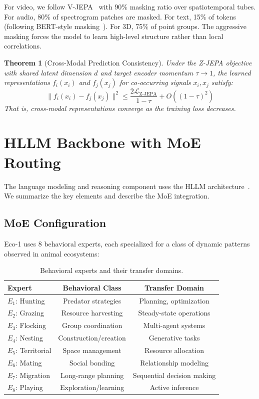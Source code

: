 \documentclass[11pt,letterpaper]{article}
\newtheorem{theorem}{Theorem}[section]
\begin{document}
For video, we follow V-JEPA~\cite{bardes2024vjepa} with 90\% masking ratio over spatiotemporal tubes. For audio, 80\% of spectrogram patches are masked. For text, 15\% of tokens (following BERT-style masking~\cite{devlin2019bert}). For 3D, 75\% of point groups. The aggressive masking forces the model to learn high-level structure rather than local correlations.

\begin{theorem}[Cross-Modal Prediction Consistency]
\label{thm:consistency}
Under the Z-JEPA objective with shared latent dimension $d$ and target encoder momentum $\tau \to 1$, the learned representations $f_i(x_i)$ and $f_j(x_j)$ for co-occurring signals $x_i, x_j$ satisfy:
\[
\|f_i(x_i) - f_j(x_j)\|^2 \leq \frac{2\mathcal{L}_{\text{Z-JEPA}}}{1 - \tau} + O((1-\tau)^2)
\]
That is, cross-modal representations converge as the training loss decreases.
\end{theorem}

\section{HLLM Backbone with MoE Routing}
\label{sec:hllm}

The language modeling and reasoning component uses the HLLM architecture~\cite{zoo_hllm}. We summarize the key elements and describe the MoE integration.

\subsection{MoE Configuration}

Eco-1 uses 8 behavioral experts, each specialized for a class of dynamic patterns observed in animal ecosystems:

\begin{table}[t]
\centering
\begin{tabular}{lcc}
\toprule
\textbf{Expert} & \textbf{Behavioral Class} & \textbf{Transfer Domain} \\
\midrule
$E_1$: Hunting & Predator strategies & Planning, optimization \\
$E_2$: Grazing & Resource harvesting & Steady-state operations \\
$E_3$: Flocking & Group coordination & Multi-agent systems \\
$E_4$: Nesting & Construction/creation & Generative tasks \\
$E_5$: Territorial & Space management & Resource allocation \\
$E_6$: Mating & Social bonding & Relationship modeling \\
$E_7$: Migration & Long-range planning & Sequential decision making \\
$E_8$: Playing & Exploration/learning & Active inference \\
\bottomrule
\end{tabular}
\caption{Behavioral experts and their transfer domains.}
\label{tab:experts}
\end{table}
\end{document}
